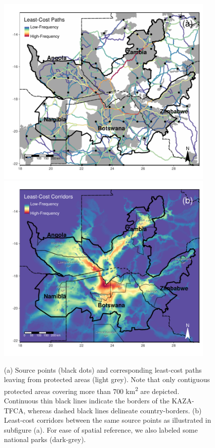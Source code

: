 \documentclass[abstract=on,10pt,a4paper,bibliography=totocnumbered]{article}
\begin{document}
\begin{figure}[hbtp]
  \begin{center}
    \begin{minipage}{0.95\textwidth}
      \includegraphics[width = 0.95\textwidth]{99_LeastCostPaths.pdf}
      \includegraphics[width = 0.95\textwidth]{99_LeastCostCorrs.pdf}
    \end{minipage}
    \caption{(a) Source points (black dots) and corresponding least-cost paths
    leaving from protected areas (light grey). Note that only contiguous
    protected areas covering more than 700 km\textsuperscript{2} are depicted.
    Continuous thin black lines indicate the borders of the KAZA-TFCA, whereas
    dashed black lines delineate country-borders. (b) Least-cost corridors
    between the same source points as illustrated in subfigure (a). For ease of
    spatial reference, we also labeled some national parks (dark-grey).}
    \label{LeastCost}
  \end{center}
\end{figure}
\end{document}
